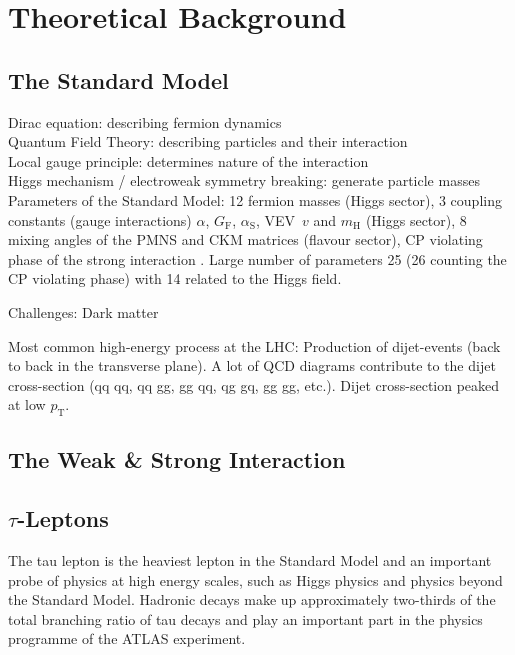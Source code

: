 \chapter{Theoretical Background}
\label{sec:theory}

\section{The Standard Model}

Dirac equation: describing fermion dynamics\\
Quantum Field Theory: describing particles and their interaction\\
Local gauge principle: determines nature of the interaction\\
Higgs mechanism / electroweak symmetry breaking: generate particle masses\\

Parameters of the Standard Model: 12 fermion masses (Higgs sector), 3 coupling
constants (gauge interactions) $\alpha$, $G_{\text{F}}$, $\alpha_{\text{S}}$,
VEV~$v$ and $m_{\text{H}}$ (Higgs sector), 8 mixing angles of the PMNS and CKM
matrices (flavour sector), CP violating phase of the strong interaction
\cite{thomson}.
Large number of parameters 25 (26 counting the CP violating phase) with 14
related to the Higgs field.

Challenges: Dark matter

Most common high-energy process at the LHC: Production of dijet-events (back to
back in the transverse plane). A lot of QCD diagrams contribute to the dijet
cross-section (qq \textrightarrow qq, qq \textrightarrow gg, gg \textrightarrow
qq, qg \textrightarrow gq, gg \textrightarrow gg, etc.). Dijet cross-section
peaked at low $p_{\text{T}}$.

\section{The Weak \& Strong Interaction}

\section{$\tau$-Leptons}


The tau lepton is the heaviest lepton in the Standard Model and an important
probe of physics at high energy scales, such as Higgs physics and physics beyond
the Standard Model. Hadronic decays make up approximately two-thirds of the
total branching ratio of tau decays and play an important part in the physics
programme of the ATLAS experiment.

